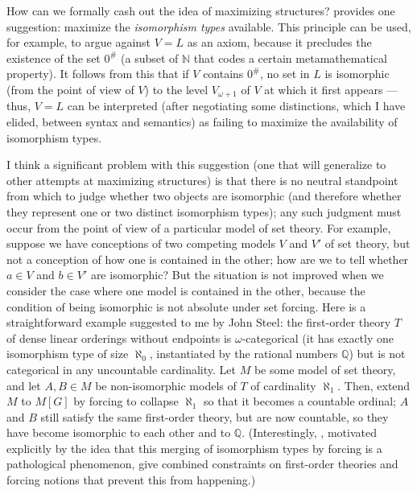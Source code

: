 \documentclass[letterpaper,12pt]{article}
\newcommand{\N}{\mathbb{N}}
\newcommand{\Q}{\mathbb{Q}}
\begin{document}
How can we formally cash out the idea of maximizing structures? \cite{maddyvlmaximize} provides one suggestion: maximize the \emph{isomorphism types} available. This principle can be used, for example, to argue against $V = L$ as an axiom, because it precludes the existence of the set $0^\#$ (a subset of $\N$ that codes a certain metamathematical property). It follows from this that if $V$ contains $0^\#$, no set in $L$ is isomorphic (from the point of view of $V$) to the level $V_{\omega+1}$ of $V$ at which it first appears --- thus, $V=L$ can be interpreted (after negotiating some distinctions, which I have elided, between syntax and semantics) as failing to maximize the availability of isomorphism types.

I think a significant problem with this suggestion (one that will generalize to other attempts at maximizing structures) is that there is no neutral standpoint from which to judge whether two objects are isomorphic (and therefore whether they represent one or two distinct isomorphism types); any such judgment must occur from the point of view of a particular model of set theory. For example, suppose we have conceptions of two competing models $V$ and $V'$ of set theory, but not a conception of how one is contained in the other; how are we to tell whether $a \in V$ and $b \in V'$ are isomorphic? But the situation is not improved when we consider the case where one model is contained in the other, because the condition of being isomorphic is not absolute under set forcing. Here is a straightforward example suggested to me by John Steel: the first-order theory $T$ of dense linear orderings without endpoints is $\omega$-categorical (it has exactly one isomorphism type of size $\aleph_0$, instantiated by the rational numbers $\Q$) but is not categorical in any uncountable cardinality. Let $M$ be some model of set theory, and let $A, B \in M$ be non-isomorphic models of $T$ of cardinality $\aleph_1$. Then, extend $M$ to $M[G]$ by forcing to collapse $\aleph_1$ so that it becomes a countable ordinal; $A$ and $B$ still satisfy the same first-order theory, but are now countable, so they have become isomorphic to each other and to $\Q$. (Interestingly, \cite{baldwin1993}, motivated explicitly by the idea that this merging of isomorphism types by forcing is a pathological phenomenon, give combined constraints on first-order theories and forcing notions that prevent this from happening.)
\end{document}
